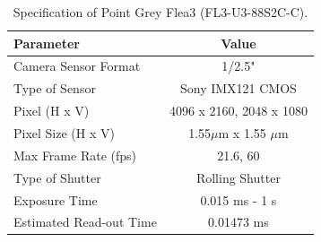 \begin{table}[!htb]
\centering
\caption{Specification of Point Grey Flea3 (FL3-U3-88S2C-C).}
	\begin{tabular}{lc}
  \hline Parameter & Value \\
  \hline 
	\hline Camera Sensor Format & 1/2.5" \\
	\hline Type of Sensor & Sony IMX121 CMOS \\
	\hline Pixel (H x V) & 4096 x 2160, 2048 x 1080 \\
	\hline Pixel Size (H x V) & 1.55$\mu$m x 1.55 $\mu$m \\
	\hline Max Frame Rate (fps) & 21.6, 60 \\
	\hline Type of Shutter & Rolling Shutter \\
	\hline Exposure Time & 0.015 ms - 1 s \\
	\hline Estimated Read-out Time & 0.01473 ms \\
  \hline 
	\end{tabular}
	\label{tab:flea_spec} 
\end{table}
